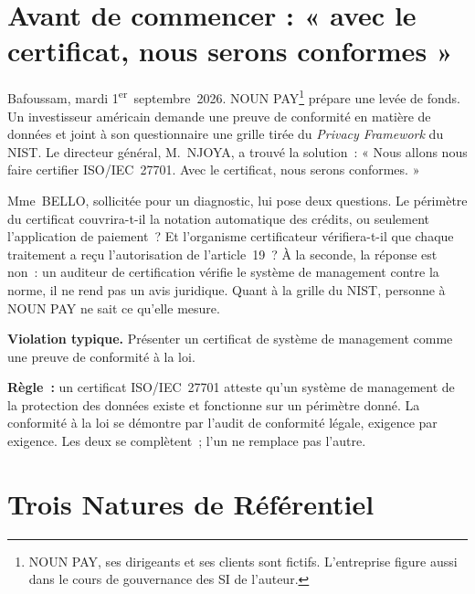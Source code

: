 \bigskip

\section*{Avant de commencer : « avec le certificat, nous serons conformes »}

Bafoussam, mardi 1\textsuperscript{er}~septembre~2026. NOUN PAY\footnote{NOUN
PAY, ses dirigeants et ses clients sont fictifs. L'entreprise figure aussi
dans le cours de gouvernance des SI de l'auteur.} prépare une levée de fonds.
Un investisseur américain demande une preuve de conformité en matière de
données et joint à son questionnaire une grille tirée du \textit{Privacy
Framework} du NIST. Le directeur général, M.~NJOYA, a trouvé la solution~: « Nous
allons nous faire certifier ISO/IEC~27701. Avec le certificat, nous serons conformes. »

Mme~BELLO, sollicitée pour un diagnostic, lui pose deux questions. Le
périmètre du certificat couvrira-t-il la notation automatique des
crédits, ou seulement l'application de paiement~? Et l'organisme
certificateur vérifiera-t-il que chaque traitement a reçu l'autorisation de
l'article~19~? À la seconde, la réponse est non~: un auditeur de
certification vérifie le système de management contre la norme, il ne
rend pas un avis juridique. Quant à la grille du NIST, personne à NOUN PAY
ne sait ce qu'elle mesure.

\begin{boxalert}
\textbf{Violation typique.} Présenter un certificat de système de
management comme une preuve de conformité à la loi.

\smallskip
\textbf{Règle~:} un certificat ISO/IEC~27701 atteste qu'un système de
management de la protection des données existe et fonctionne sur un
périmètre donné. La conformité à la loi se démontre par l'audit de
conformité légale, exigence par exigence. Les deux se complètent~; l'un ne
remplace pas l'autre.
\end{boxalert}

\section{Trois Natures de Référentiel}
\label{sec:c05-natures}

